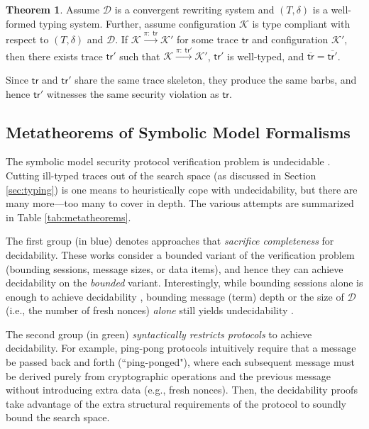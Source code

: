 \documentclass{article}
\theoremstyle{definition}
\newtheorem{theorem}{Theorem}
\begin{document}
\begin{theorem}
Assume $\mathcal{D}$ is a convergent rewriting system and $(T, \delta)$ is a well-formed typing system. 
Further, assume configuration $\mathcal{K}$ is type compliant with respect to $(T, \delta)$ and $\mathcal{D}$.
If $\mathcal{K}\xrightarrow{\pi:\; \mathsf{tr}} \mathcal{K}'$ for some trace $\mathsf{tr}$ and configuration $\mathcal{K}'$, then there exists trace $\mathsf{tr}'$ such that $\mathcal{K}\xrightarrow{\pi:\; \mathsf{tr}'} \mathcal{K}'$, $\mathsf{tr}'$ is well-typed, and $\overline{\mathsf{tr}} = \overline{\mathsf{tr}'}$.
\end{theorem}

Since $\mathsf{tr}$ and $\mathsf{tr}'$ share the same trace skeleton, 
they produce the same barbs, and hence $\mathsf{tr}'$ witnesses 
the same security violation as $\mathsf{tr}$.

\subsection{Metatheorems of Symbolic Model Formalisms}
The symbolic model security protocol verification problem is undecidable \cite{undecidable1,undecidable2}. Cutting ill-typed traces out of the search space (as discussed in Section \ref{sec:typing}) is one means to heuristically cope with undecidability, but there are many more---too many to cover in depth. The various attempts are summarized in Table \ref{tab:metatheorems}.

The first group (in blue) denotes approaches that \emph{sacrifice completeness} for decidability. These works consider a bounded variant of the verification problem (bounding sessions, message sizes, or data items), and hence they can achieve decidability on the \emph{bounded} variant. Interestingly, while bounding sessions alone is enough to achieve decidability \cite{bounded_sessions}, bounding message (term) depth or the size of $\mathcal{D}$ (i.e., the number of fresh nonces) \emph{alone} still yields undecidability \cite{bounded_undecidable}.

The second group (in green) \emph{syntactically restricts protocols} to achieve decidability. For example, ping-pong protocols \cite{pingpong} intuitively require that a message be  passed back and forth (``ping-ponged"), where each subsequent message must be derived purely from cryptographic operations and the previous message without introducing extra data (e.g., fresh nonces). Then, the decidability proofs take advantage of the extra structural requirements of the protocol to soundly bound the search space.
\end{document}
